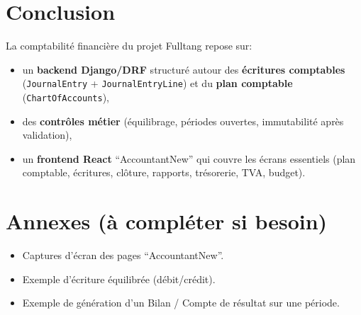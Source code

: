 \documentclass[12pt,a4paper]{article}
\begin{document}
\section{Conclusion}
La comptabilité financière du projet Fulltang repose sur:
\begin{itemize}[leftmargin=1.2cm]
  \item un \textbf{backend Django/DRF} structuré autour des \textbf{écritures comptables} (\texttt{JournalEntry} + \texttt{JournalEntryLine}) et du \textbf{plan comptable} (\texttt{ChartOfAccounts}),
  \item des \textbf{contrôles métier} (équilibrage, périodes ouvertes, immutabilité après validation),
  \item un \textbf{frontend React} “AccountantNew” qui couvre les écrans essentiels (plan comptable, écritures, clôture, rapports, trésorerie, TVA, budget).
\end{itemize}

\section{Annexes (à compléter si besoin)}
\begin{itemize}[leftmargin=1.2cm]
  \item Captures d’écran des pages “AccountantNew”.
  \item Exemple d’écriture équilibrée (débit/crédit).
  \item Exemple de génération d’un Bilan / Compte de résultat sur une période.
\end{itemize}
\end{document}
